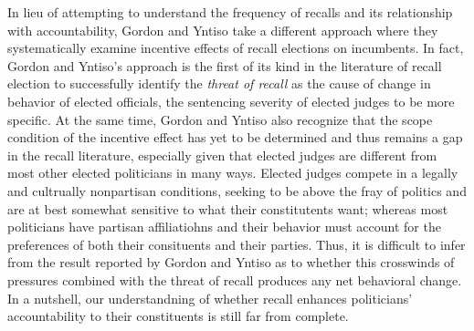 \documentclass{article}
\begin{document}
		In lieu of attempting to understand the frequency of recalls and its relationship with accountability,
		Gordon and Yntiso \autocite*{gordonIncentiveEffectsRecall2021a}
		take a different approach
		where they systematically examine
		incentive effects of recall elections on incumbents.
		In fact,
		Gordon and Yntiso's approach is the first of its kind in the literature of recall election
		to
		successfully identify the \textit{threat of recall}
		as the cause of change in behavior of elected officials, 
		the sentencing severity of elected judges to be more specific.
		At the same time,
		Gordon and Yntiso \autocite*{gordonIncentiveEffectsRecall2021a} also recognize that the scope condition of the incentive effect has yet to be determined
		and thus remains a gap in the recall literature,
		especially given that elected judges are different from most other elected politicians in many ways.
		Elected judges compete in a legally and cultrually nonpartisan conditions,
		seeking to be above the fray of politics and are at best somewhat sensitive to what their constitutents want;
		whereas most politicians have partisan affiliatiohns
		and their behavior must account for the preferences of both their consituents and their parties.
		Thus, it is difficult to infer from the result reported by
		Gordon and Yntiso \autocite*{gordonIncentiveEffectsRecall2021a}
		as to
		whether this crosswinds of pressures combined with the threat of recall
		produces any net behavioral change.
		In a nutshell, our understandning of whether recall enhances
		politicians' accountability to their constituents
		is still far from complete.
		
\end{document}
